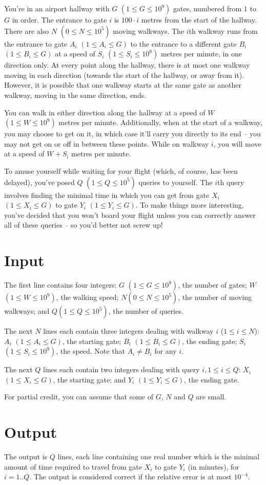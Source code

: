 
You're in an airport hallway with $G$ $(1 \leq G \leq 10^9)$ gates, numbered from $1$ to $G$ in
order. The entrance to gate $i$ is $100 \cdot i$ metres from the start of the hallway. There are
also $N$ $(0 \leq N \leq 10^5)$ moving walkways. The $i$th walkway runs from the entrance to gate
$A_i$ $(1 \leq A_i \leq G)$ to the entrance to a different gate $B_i$ $(1 \leq B_i \leq G)$ at a
speed of $S_i$ $(1 \leq S_i \leq 10^9)$ metres per minute, in one direction only. At every point
along the hallway, there is at most one walkway moving in each direction (towards the start of the
hallway, or away from it). However, it is possible that one walkway starts at the same gate as
another walkway, moving in the same direction, ends.

You can walk in either direction along the hallway at a speed of $W$ $(1 \leq W \leq 10^9)$ metres
per minute. Additionally, when at the start of a walkway, you may choose to get on it, in which case
it'll carry you directly to its end -- you may not get on or off in between these points. While on
walkway $i$, you will move at a speed of $W + S_i$ metres per minute.

To amuse yourself while waiting for your flight (which, of course, has been delayed), you've posed
$Q$ $(1 \leq Q \leq 10^5)$ queries to yourself. The $i$th query involves finding the minimal time in
which you can get from gate $X_i$ $(1 \leq X_i \leq G)$ to gate $Y_i$ $(1 \leq Y_i \leq G)$. To make
things more interesting, you've decided that you won't board your flight unless you can correctly
answer all of these queries -- so you'd better not screw up!

\section*{Input}
The first line contains four integers: $G$ $(1 \leq G \leq 10^9)$, the number of gates; $W$ $(1 \leq
W \leq 10^9)$, the walking speed; $N (0 \leq N \leq 10^5)$, the number of moving walkways; and $Q (1
\leq Q \leq 10^5)$, the number of queries.

The next $N$ lines each contain three integers dealing with walkway $i$ ($1\leq i \leq N$): $A_i$
$(1 \leq A_i \leq G)$, the starting gate; $B_i$ $(1 \leq B_i \leq G)$, the ending gate; $S_i$ $(1 \leq
S_i \leq 10^9)$, the speed. Note that $A_i \neq B_i$ for any $i$.

The next $Q$ lines each contain two integers dealing with query $i, 1 \leq i \leq Q$: $X_i$ $(1 \leq
X_i \leq G)$, the starting gate; and $Y_i$ $(1 \leq Y_i \leq G)$, the ending gate.

For partial credit, you can assume that some of $G$, $N$ and $Q$ are small.

\section*{Output}
The output is $Q$ lines, each line containing one real number which is the minimal amount of time
required to travel from gate $X_i$ to gate $Y_i$ (in minutes), for $i = 1..Q$. The output is
considered correct if the relative error is at most $10^{-4}$.
